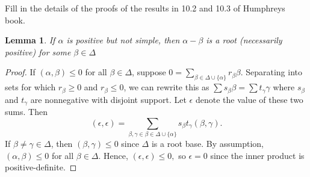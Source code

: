 \documentclass{article}
\newtheorem{lem}[thm]{Lemma}
\begin{document}
\p Fill in the details of the proofs of the results in 10.2 and 10.3 of Humphreys book.

\begin{lem} If $\alpha$ is positive but not simple, then $\alpha - \beta$ is a root 
(necessarily positive) for some $\beta \in \Delta$
\end{lem}
\begin{proof}
If $(\alpha, \beta) \le 0$ for all $\beta \in \Delta$, suppose
$0 = \sum_{\beta \in \Delta \cup \{ \alpha \}} r_\beta \beta$.  Separating into 
sets for which $r_\beta \ge 0$ and $r_\beta \le 0$, we can rewrite this as
$\sum s_\beta \beta = \sum t_\gamma \gamma$ where $s_\beta$ and $t_\gamma$
are nonnegative with disjoint support.  Let $\epsilon$ denote the value
of these two sums.  Then
$$(\epsilon, \epsilon) = \sum_{\beta, \gamma \in \beta \in \Delta \cup \{ \alpha \}} s_\beta t_\gamma (\beta, \gamma).$$
If $\beta \neq \gamma \in \Delta$, then $(\beta, \gamma) \le 0$ since $\Delta$ is a root base. By assumption,
$(\alpha, \beta) \le 0$ for all $\beta \in \Delta$.  Hence, 
$(\epsilon, \epsilon) \le 0,$
so $\epsilon = 0$ since the inner product is positive-definite.  



\end{proof}
\end{document}
